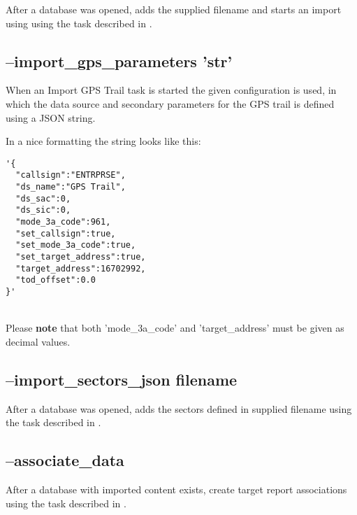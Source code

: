 After a database was opened, adds the supplied filename and starts an import using using the task described in .

\subsection{--import\_gps\_parameters 'str'}

When an Import GPS Trail task is started the given configuration is used, in which the data source and secondary parameters for the GPS trail is defined using a JSON string.

In a nice formatting the string looks like this:
\begin{lstlisting}[basicstyle=\small\ttfamily]
'{
  "callsign":"ENTRPRSE",
  "ds_name":"GPS Trail",
  "ds_sac":0,
  "ds_sic":0,
  "mode_3a_code":961,
  "set_callsign":true,
  "set_mode_3a_code":true,
  "set_target_address":true,
  "target_address":16702992,
  "tod_offset":0.0
}'
\end{lstlisting}
\ \\

Please \textbf{note} that both 'mode\_3a\_code' and 'target\_address' must be given as decimal values.

% 
% 


\subsection{--import\_sectors\_json  filename}

After a database was opened, adds the sectors defined in supplied filename using the task described in .

\subsection{--associate\_data}

After a database with imported content exists, create target report associations using the task described in .

